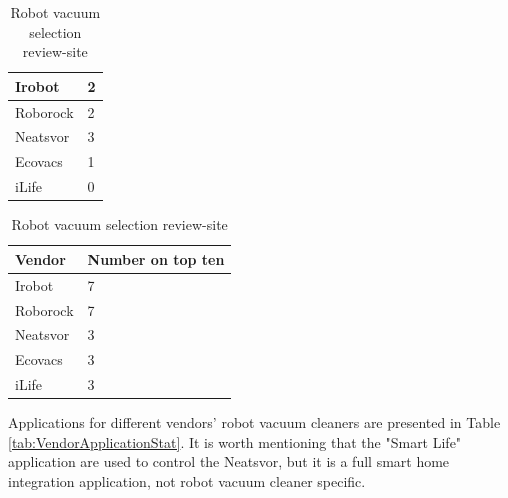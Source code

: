 \begin{table}[H]
\begin{subtable}[b]{0.45\linewidth}
\begin{tabular}{|l|l|}
            Irobot      & 2                 \\                   \hline
            Roborock    & 2                 \\                   \hline
            Neatsvor    & 3                 \\                   \hline
            Ecovacs     & 1                 \\                   \hline
            iLife       & 0                 \\                   \hline
        \end{tabular}
    \end{subtable}
    \hspace{0.5cm}
    \begin{subtable}[b]{0.45\linewidth}
        \centering
        \caption{Summary of all review-sites}
        \begin{tabular}{|l|l|}
            \hline
            \textbf{Vendor}    & \textbf{Number on top ten} \\ \hline
            Irobot      & 7                 \\                   \hline
            Roborock    & 7                 \\                   \hline
            Neatsvor    & 3                 \\                   \hline
            Ecovacs     & 3                 \\                   \hline
            iLife       & 3                 \\                   \hline
        \end{tabular}
    \end{subtable}
    \caption{Robot vacuum selection review-site}
\end{table}

Applications for different vendors' robot vacuum cleaners are presented in Table \ref{tab:VendorApplicationStat}. It is worth mentioning that the "Smart Life" application are used to control the Neatsvor, but it is a full smart home integration application, not robot vacuum cleaner specific. 

